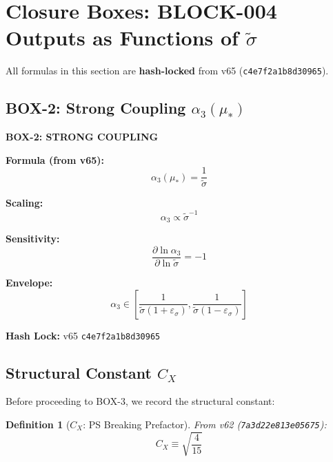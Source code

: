 \documentclass[11pt,letterpaper]{article}
\newtheorem{definition}[theorem]{Definition}
\newcommand{\st}{\tilde{\sigma}}
\newcommand{\eps}{\varepsilon}
\begin{document}
\section{Closure Boxes: BLOCK-004 Outputs as Functions of $\st$}
\label{sec:closure-boxes}

All formulas in this section are \textbf{hash-locked} from v65 (\texttt{c4e7f2a1b8d30965}).

\subsection{BOX-2: Strong Coupling $\alpha_3(\mu_*)$}
\label{subsec:box2}

\begin{closurebox}
\textbf{BOX-2: STRONG COUPLING}

\textbf{Formula (from v65):}
\begin{equation}
\boxed{
\alpha_3(\mu_*) = \frac{1}{\st}
}
\label{eq:box2-alpha3}
\end{equation}

\textbf{Scaling:}
\begin{equation}
\alpha_3 \propto \st^{-1}
\label{eq:alpha3-scaling}
\end{equation}

\textbf{Sensitivity:}
\begin{equation}
\frac{\partial \ln \alpha_3}{\partial \ln \st} = -1
\label{eq:alpha3-sensitivity}
\end{equation}

\textbf{Envelope:}
\begin{equation}
\alpha_3 \in \left[ \frac{1}{\st(1+\eps_\sigma)}, \frac{1}{\st(1-\eps_\sigma)} \right]
\label{eq:alpha3-envelope}
\end{equation}

\textbf{Hash Lock:} v65 \texttt{c4e7f2a1b8d30965}
\end{closurebox}

\subsection{Structural Constant $C_X$}
\label{subsec:cx-constant}

Before proceeding to BOX-3, we record the structural constant:

\begin{definition}[$C_X$: PS Breaking Prefactor]
\label{def:cx}
From v62 (\texttt{7a3d22e813e05675}):
\begin{equation}
C_X \equiv \sqrt{\frac{4}{15}}
\label{eq:cx-def}
\end{equation}
\end{definition}
\end{document}

